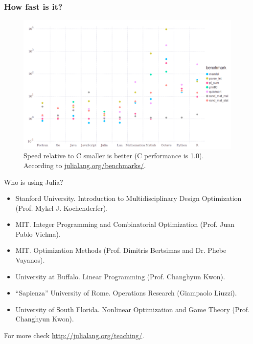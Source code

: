 \documentclass{beamer}
\begin{document}
\begin{frame}
  \frametitle{How fast is it?}
  \begin{figure}[htpb]
    \centering
    \includegraphics[scale=0.2]{BenchmarkImage.png}
    \caption{Speed relative to C smaller is better (C performance is 1.0). According to \url{julialang.org/benchmarks/}.}
    \label{fig:benchmark}
  \end{figure}
\end{frame}

\begin{frame}{Who is using Julia?}
  \begin{itemize}\footnotesize
  \item[] Stanford University. Introduction to Multidisciplinary Design Optimization (Prof. Mykel J. Kochenderfer).
  \item[] MIT. Integer Programming and Combinatorial Optimization (Prof. Juan Pablo Vielma).
  \item[] MIT. Optimization Methods (Prof. Dimitris Bertsimas and Dr. Phebe Vayanos).
  \item[] University at Buffalo. Linear Programming (Prof. Changhyun Kwon).
  \item[] “Sapienza” University of Rome. Operations Research (Giampaolo Liuzzi).
    \item[] University of South Florida. Nonlinear Optimization and Game Theory (Prof. Changhyun Kwon).
    \end{itemize}

    \footnotesize{For more check \url{http://julialang.org/teaching/}.}
\end{frame}
\end{document}

